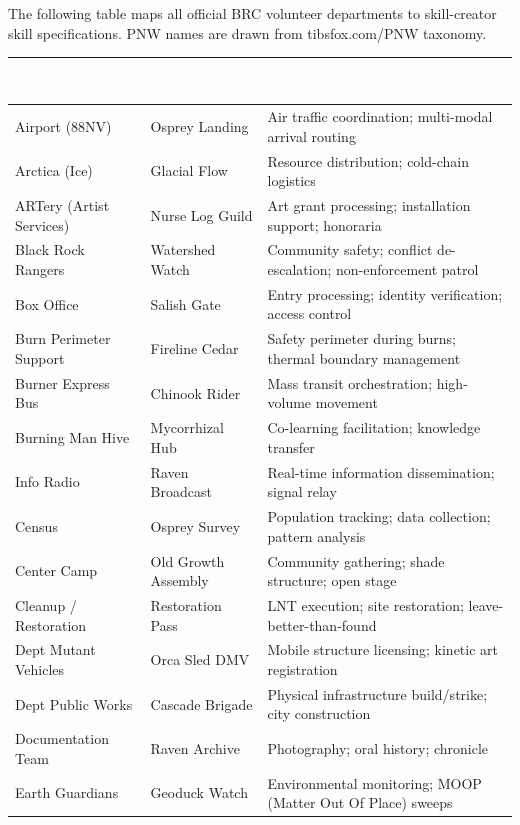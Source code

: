 \documentclass[11pt,letterpaper]{article}
\newcommand{\tableheader}[1]{\textbf{\sffamily\textcolor{white}{#1}}}
\begin{document}
The following table maps all official BRC volunteer departments to skill-creator skill specifications. PNW names are drawn from tibsfox.com/PNW taxonomy.

\begin{center}
\begin{tabularx}{\textwidth}{L{3cm}L{3.5cm}X}
\toprule
{}
\tableheader{BRC Department} & \tableheader{PNW Skill Name} & \tableheader{Role Description} \\
\midrule
Airport (88NV) & Osprey Landing & Air traffic coordination; multi-modal arrival routing \\
Arctica (Ice) & Glacial Flow & Resource distribution; cold-chain logistics \\
ARTery (Artist Services) & Nurse Log Guild & Art grant processing; installation support; honoraria \\
Black Rock Rangers & Watershed Watch & Community safety; conflict de-escalation; non-enforcement patrol \\
Box Office & Salish Gate & Entry processing; identity verification; access control \\
Burn Perimeter Support & Fireline Cedar & Safety perimeter during burns; thermal boundary management \\
Burner Express Bus & Chinook Rider & Mass transit orchestration; high-volume movement \\
Burning Man Hive & Mycorrhizal Hub & Co-learning facilitation; knowledge transfer \\
Info Radio & Raven Broadcast & Real-time information dissemination; signal relay \\
Census & Osprey Survey & Population tracking; data collection; pattern analysis \\
Center Camp & Old Growth Assembly & Community gathering; shade structure; open stage \\
Cleanup / Restoration & Restoration Pass & LNT execution; site restoration; leave-better-than-found \\
Dept Mutant Vehicles & Orca Sled DMV & Mobile structure licensing; kinetic art registration \\
Dept Public Works & Cascade Brigade & Physical infrastructure build/strike; city construction \\
Documentation Team & Raven Archive & Photography; oral history; chronicle \\
Earth Guardians & Geoduck Watch & Environmental monitoring; MOOP (Matter Out Of Place) sweeps \\

\end{tabularx}
\end{center}
\end{document}

